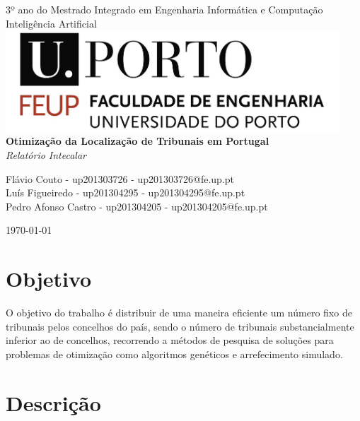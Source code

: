 \documentclass[11pt,a4paper,reqno]{article}
\numberwithin{equation}{section}
\begin{document}
\begin{titlepage}
\begin{center}

{\large 3º ano do Mestrado Integrado em Engenharia Informática e Computação \\[5mm]}
{\Large Inteligência Artificial}\\[3cm]

\includegraphics[width=12.5cm]{feup_logo.jpg}\\[3cm]

{\Huge \bfseries Otimização da Localização de Tribunais em Portugal \\[5mm]}
{\large \textit{Relatório Intecalar} \\[2cm]}


{\large Flávio Couto - up201303726 - up201303726@fe.up.pt\\[1mm]}
{\large Luís Figueiredo - up201304295 - up201304295@fe.up.pt \\[1mm]}
{\large Pedro Afonso Castro - up201304205 - up201304205@fe.up.pt\\[1mm]}


{\large \today}

\end{center}
\end{titlepage}

\tableofcontents

\section{Objetivo}

O objetivo do trabalho é distribuir de uma maneira eficiente um número fixo de tribunais pelos concelhos do país, sendo o número de tribunais substancialmente inferior ao de concelhos, recorrendo a métodos de pesquisa de soluções para problemas de otimização como algoritmos genéticos e arrefecimento simulado. 


\section{Descrição} 
\end{document}
